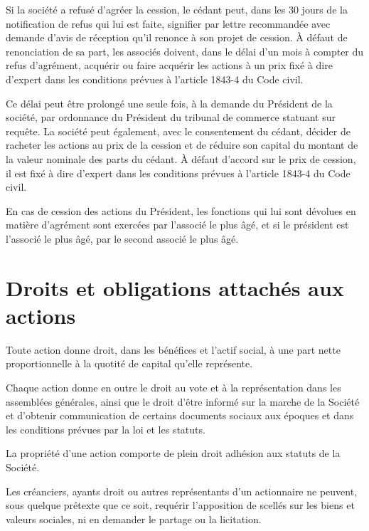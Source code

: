 \documentclass[a4paper,12pt]{report}
\begin{document}
Si la société a refusé d'agréer la cession, le cédant peut, dans les 30 jours de la notification de refus qui lui est faite, 
signifier par lettre recommandée avec demande d'avis de réception qu'il renonce à son projet de cession. 
À défaut de renonciation de sa part, les associés doivent, dans le délai d'un mois à compter du refus d'agrément, 
acquérir ou faire acquérir les actions à un prix fixé à dire d'expert dans les conditions prévues à l'article 1843-4 du Code civil.  

Ce délai peut être prolongé une seule fois, à la demande du Président de la société, par ordonnance du Président du tribunal de commerce statuant sur requête. 
La société peut également, avec le consentement du cédant, décider de racheter les actions au prix de la cession 
et de réduire son capital du montant de la valeur nominale des parts du cédant. 
À défaut d'accord sur le prix de cession, il est fixé à dire d'expert dans les conditions prévues à l'article 1843-4 du Code civil.  

En cas de cession des actions du Président, les fonctions qui lui sont dévolues en matière d'agrément sont exercées par l'associé le plus âgé, 
et si le président est l'associé le plus âgé, par le second associé le plus âgé.  

\section{Droits et obligations attachés aux actions}
Toute action donne droit, dans les bénéfices et l'actif social, à une part nette proportionnelle à la quotité de capital qu'elle représente.

Chaque action donne en outre le droit au vote et à la représentation dans les assemblées générales, 
ainsi que le droit d'être informé sur la marche de la Société et d'obtenir communication de certains documents sociaux aux époques 
et dans les conditions prévues par la loi et les statuts.

La propriété d'une action comporte de plein droit adhésion aux statuts de la Société.

Les créanciers, ayants droit ou autres représentants d'un actionnaire ne peuvent, sous quelque prétexte que ce soit, 
requérir l'apposition de scellés sur les biens et valeurs sociales, ni en demander le partage ou la licitation.
\end{document}
